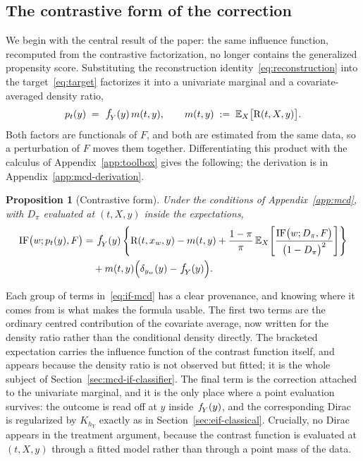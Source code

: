 \documentclass[11pt]{article}
\theoremstyle{plain}
\newtheorem{mypropo}{Proposition}
\theoremstyle{definition}
\theoremstyle{remark}
\newcommand{\pE}{\ensuremath{\mathbb{E}}}
\newcommand{\pf}[1]{\ensuremath{\,\mathlarger{\textit{f}}_{#1}}}
\newcommand{\ratio}{\ensuremath{\pi}}
\newcommand{\contrast}{D_{\ratio}}
\newcommand{\DensityRatio}{\text{R}}
\newcommand{\IF}{\mathrm{IF}}
\begin{document}
\subsection{The contrastive form of the correction}
\label{sec:mcd-form}

We begin with the central result of the paper: the same influence function,
recomputed from the contrastive factorization, no longer contains the generalized propensity
score. Substituting the reconstruction identity~\eqref{eq:reconstruction} into the
target~\eqref{eq:target} factorizes it into a univariate marginal and a covariate-averaged
density ratio,
\begin{equation}
p_t(y) \;=\; \pf{Y}(y)\,m(t,y),
\qquad
m(t,y) \;:=\; \pE_X\big[\DensityRatio(t,X,y)\big] .
\label{eq:factorization}
\end{equation}
Both factors are functionals of $F$, and both are estimated from the same data, so a
perturbation of $F$ moves them together. Differentiating this product with the calculus of
Appendix~\ref{app:toolbox} gives the following; the derivation is in
Appendix~\ref{app:mcd-derivation}.

\begin{mypropo}[Contrastive form]
\label{prop:if-mcd}
Under the conditions of Appendix~\ref{app:mcd}, with $\contrast$ evaluated at $(t,X,y)$ inside
the expectations,
\begin{equation}
\begin{aligned}
\IF\big(w;p_t(y),F\big)
&= \pf{Y}(y)\left\{
\DensityRatio(t,x_w,y) - m(t,y)
+ \frac{1-\ratio}{\ratio}\,
\pE_X\!\left[ \frac{\IF\big(w;\contrast,F\big)}{\big(1-\contrast\big)^{2}} \right]
\right\} \\
&\quad + m(t,y)\Big( \delta_{y_w}(y) - \pf{Y}(y) \Big).
\end{aligned}
\label{eq:if-mcd}
\end{equation}
\end{mypropo}

Each group of terms in~\eqref{eq:if-mcd} has a clear provenance, and knowing where it comes
from is what makes the formula usable. The first two terms are the ordinary centred
contribution of the covariate average, now written for the density ratio rather than the
conditional density directly. The bracketed expectation carries the influence function of the
contrast function itself, and appears because the density ratio is not observed but fitted; it
is the whole subject of Section~\ref{sec:mcd-if-classifier}. The final term is the correction
attached to the univariate marginal, and it is the only place where a point evaluation
survives: the outcome is read off at $y$ inside $\pf{Y}(y)$, and the corresponding Dirac is
regularized by $K_{h_Y}$ exactly as in Section~\ref{sec:eif-classical}. Crucially, no Dirac
appears in the treatment argument, because the contrast function is evaluated at $(t,X,y)$
through a fitted model rather than through a point mass of the data.
\end{document}
